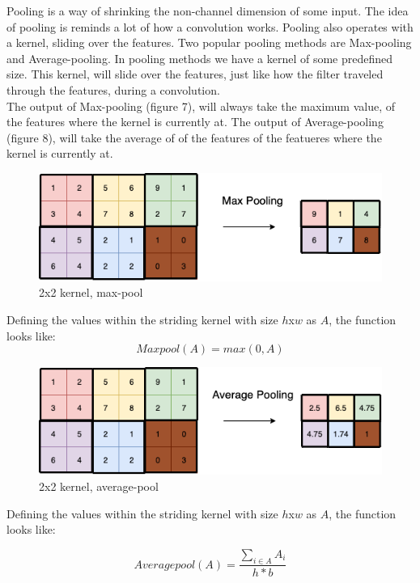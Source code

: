 Pooling is a way of shrinking the non-channel dimension of some input. The idea of pooling is reminds a lot of how a convolution works. Pooling also operates with a kernel, sliding over the features. Two popular pooling methods are Max-pooling and Average-pooling. In pooling methods we have a kernel of some predefined size. This kernel, will slide over the features, just like how the filter traveled through the features, during a convolution. \\

\noindent
The output of Max-pooling (figure 7), will always take the maximum value, of the features where the kernel is currently at. The output of Average-pooling (figure 8), will take the average of of the features of the featueres where the kernel is currently at. \\


\begin{figure}[!ht]
  \centering
  \includegraphics[scale=0.4]{latex/IMGs/maxpooling.png}
  \caption{2x2 kernel, max-pool}\label{Baseline:before}
\end{figure}

\noindent
Defining the values within the striding kernel with size $h$x$w$ as $A$, the function looks like:
$$
Maxpool(A) = max(0,A)
$$

\begin{figure}[!ht]
  \centering
  \includegraphics[scale=0.4]{latex/IMGs/averagepooling.png}
  \caption{2x2 kernel, average-pool}\label{Baseline:before}
\end{figure}

\noindent
Defining the values within the striding kernel with size $h$x$w$ as $A$, the function looks like:

$$
Averagepool(A) = \frac{\sum_{i \in A} A_i}{h * b}
$$




